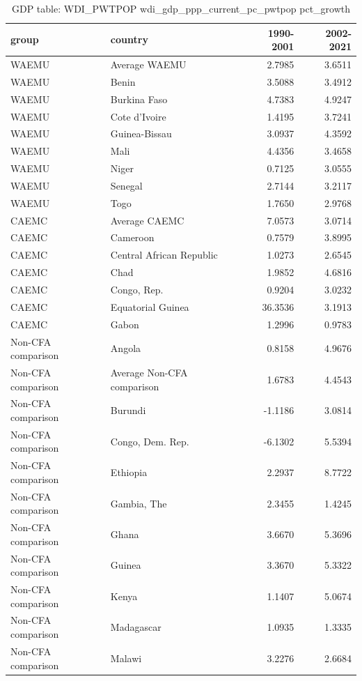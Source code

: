 \begin{table}

\caption{GDP table: WDI_PWTPOP wdi_gdp_ppp_current_pc_pwtpop pct_growth}
\centering
\begin{tabular}[t]{llrr}
\toprule
group & country & 1990-2001 & 2002-2021\\
\midrule
WAEMU & Average WAEMU & 2.7985 & 3.6511\\
WAEMU & Benin & 3.5088 & 3.4912\\
WAEMU & Burkina Faso & 4.7383 & 4.9247\\
WAEMU & Cote d'Ivoire & 1.4195 & 3.7241\\
WAEMU & Guinea-Bissau & 3.0937 & 4.3592\\
\addlinespace
WAEMU & Mali & 4.4356 & 3.4658\\
WAEMU & Niger & 0.7125 & 3.0555\\
WAEMU & Senegal & 2.7144 & 3.2117\\
WAEMU & Togo & 1.7650 & 2.9768\\
CAEMC & Average CAEMC & 7.0573 & 3.0714\\
\addlinespace
CAEMC & Cameroon & 0.7579 & 3.8995\\
CAEMC & Central African Republic & 1.0273 & 2.6545\\
CAEMC & Chad & 1.9852 & 4.6816\\
CAEMC & Congo, Rep. & 0.9204 & 3.0232\\
CAEMC & Equatorial Guinea & 36.3536 & 3.1913\\
\addlinespace
CAEMC & Gabon & 1.2996 & 0.9783\\
Non-CFA comparison & Angola & 0.8158 & 4.9676\\
Non-CFA comparison & Average Non-CFA comparison & 1.6783 & 4.4543\\
Non-CFA comparison & Burundi & -1.1186 & 3.0814\\
Non-CFA comparison & Congo, Dem. Rep. & -6.1302 & 5.5394\\
\addlinespace
Non-CFA comparison & Ethiopia & 2.2937 & 8.7722\\
Non-CFA comparison & Gambia, The & 2.3455 & 1.4245\\
Non-CFA comparison & Ghana & 3.6670 & 5.3696\\
Non-CFA comparison & Guinea & 3.3670 & 5.3322\\
Non-CFA comparison & Kenya & 1.1407 & 5.0674\\
\addlinespace
Non-CFA comparison & Madagascar & 1.0935 & 1.3335\\
Non-CFA comparison & Malawi & 3.2276 & 2.6684\\

\end{tabular}
\end{table}
